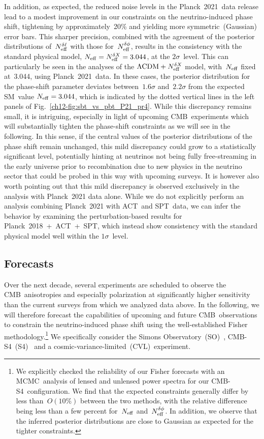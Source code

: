 In addition, as expected, the reduced noise levels in the Planck~2021~data release lead to a modest improvement in our constraints on the neutrino-induced phase shift, tightening by approximately~20\% and yielding more symmetric~(Gaussian) error bars. This sharper precision, combined with the agreement of the posterior distributions of~$N_\mathrm{eff}^{\delta\ell}$ with those for~$N_\mathrm{eff}^{\delta\phi}$, results in the consistency with the standard physical model, $N_\mathrm{eff} = N_\mathrm{eff}^{\delta X} = 3.044$, at the $2\sigma$~level. This can particularly be seen in the analyses of the $\Lambda\mathrm{CDM} + N_\mathrm{eff}^{\delta X}$ model, with~$N_\mathrm{eff}$ fixed at~3.044, using Planck~2021~data. In these cases, the posterior distribution for the phase-shift parameter deviates between~$1.6\sigma$ and~$2.2\sigma$ from the expected SM~value $N_\mathrm{eff}=3.044$, which is indicated by the dotted vertical lines in the left panels of Fig.~\ref{ch12-fig:sbt_vs_pbt_P21_pr4}. While this discrepancy remains small, it is intriguing, especially in light of upcoming CMB~experiments which will substantially tighten the phase-shift constraints as we will see in the following. In this sense, if the central values of the posterior distributions of the phase shift remain unchanged, this mild discrepancy could grow to a statistically significant level, potentially hinting at neutrinos not being fully free-streaming in the early universe prior to recombination due to new physics in the neutrino sector that could be probed in this way with upcoming surveys. It is however also worth pointing out that this mild discrepancy is observed exclusively in the analysis with Planck~2021 data alone. While we do not explicitly perform an analysis combining Planck~2021 with ACT~and SPT~data, we can infer the behavior by examining the perturbation-based results for \mbox{Planck~2018 + ACT + SPT}, which instead show consistency with the standard physical model well within the $1\sigma$~level.


\subsection{Forecasts}
\label{ch12-sec:forecasts}

Over the next decade, several experiments are scheduled to observe the CMB~anisotropies and especially polarization at significantly higher sensitivity than the current surveys from which we analyzed data above. In the following, we will therefore forecast the capabilities of upcoming and future CMB~observations to constrain the neutrino-induced phase shift using the well-established Fisher methodology.\footnote{We explicitly checked the reliability of our Fisher forecasts with an MCMC~analysis of lensed and unlensed power spectra for our \mbox{CMB-S4}~configuration. We find that the expected constraints generally differ by less than~$O(10\%)$ between the two methods, with the relative difference being less than a few percent for~$N_\mathrm{eff}$ and~$N_\mathrm{eff}^{\delta\phi}$. In addition, we observe that the inferred posterior distributions are close to Gaussian as expected for the tighter constraints.} We specifically consider the Simons Observatory~(SO)~\cite{SimonsObservatory:2018koc}, \mbox{CMB-S4}~(S4)~\cite{Abazajian:2019eic, CMB-S4:2022ght} and a cosmic-variance-limited~(CVL)~experiment.\medskip

